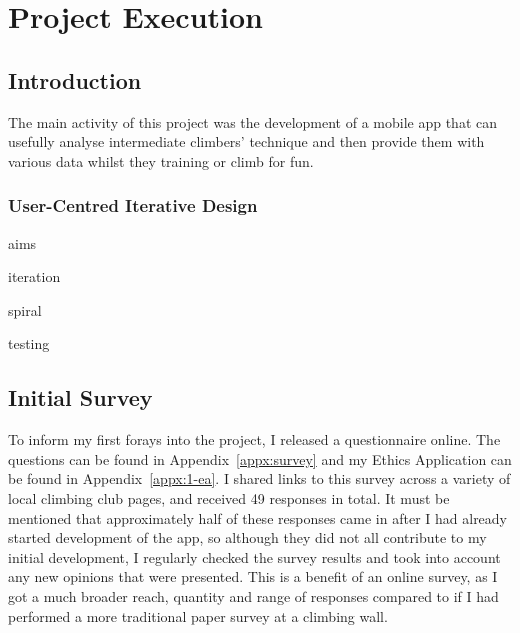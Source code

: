 \chapter{Project Execution}
\label{chap:execution}


\section{Introduction}
The main activity of this project was the development of a mobile app that can usefully analyse intermediate climbers' technique and then provide them with various data whilst they training or climb for fun.

\subsection{User-Centred Iterative Design}
aims

iteration

spiral

testing

\section{Initial Survey}
To inform my first forays into the project, I released a questionnaire online.
The questions can be found in Appendix~\ref{appx:survey} and my Ethics Application can be found in Appendix~\ref{appx:1-ea}.
I shared links to this survey across a variety of local climbing club pages, and received 49 responses in total. 
It must be mentioned that approximately half of these responses came in after I had already started development of the app, so although they did not all contribute to my initial development, I regularly checked the survey results and took into account any new opinions that were presented.
This is a benefit of an online survey, as I got a much broader reach, quantity and range of responses compared to if I had performed a more traditional paper survey at a climbing wall.


